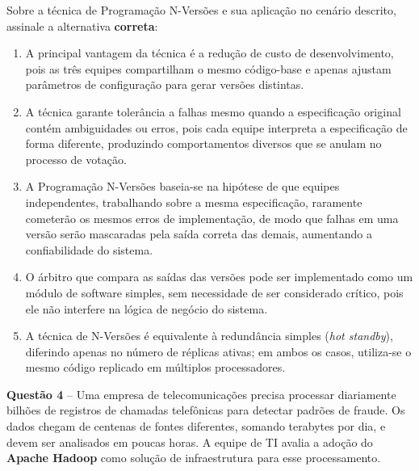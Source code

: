 \documentclass[12pt,a4paper]{article}
\begin{document}
\vspace{0.2cm}

Sobre a técnica de Programação N-Versões e sua aplicação no cenário descrito, assinale a alternativa \textbf{correta}:

\vspace{0.3cm}

\begin{enumerate}[label=\textbf{(\Alph*)}]
    \item A principal vantagem da técnica é a redução de custo de desenvolvimento, pois as três equipes compartilham o mesmo código-base e apenas ajustam parâmetros de configuração para gerar versões distintas.

    \item A técnica garante tolerância a falhas mesmo quando a especificação original contém ambiguidades ou erros, pois cada equipe interpreta a especificação de forma diferente, produzindo comportamentos diversos que se anulam no processo de votação.

    \item A Programação N-Versões baseia-se na hipótese de que equipes independentes, trabalhando sobre a mesma especificação, raramente cometerão os mesmos erros de implementação, de modo que falhas em uma versão serão mascaradas pela saída correta das demais, aumentando a confiabilidade do sistema.

    \item O árbitro que compara as saídas das versões pode ser implementado como um módulo de software simples, sem necessidade de ser considerado crítico, pois ele não interfere na lógica de negócio do sistema.

    \item A técnica de N-Versões é equivalente à redundância simples (\textit{hot standby}), diferindo apenas no número de réplicas ativas; em ambos os casos, utiliza-se o mesmo código replicado em múltiplos processadores.
\end{enumerate}

\vspace{0.5cm}

\textbf{Questão 4} -- Uma empresa de telecomunicações precisa processar diariamente bilhões de registros de chamadas telefônicas para detectar padrões de fraude. Os dados chegam de centenas de fontes diferentes, somando terabytes por dia, e devem ser analisados em poucas horas. A equipe de TI avalia a adoção do \textbf{Apache Hadoop} como solução de infraestrutura para esse processamento.
\end{document}
